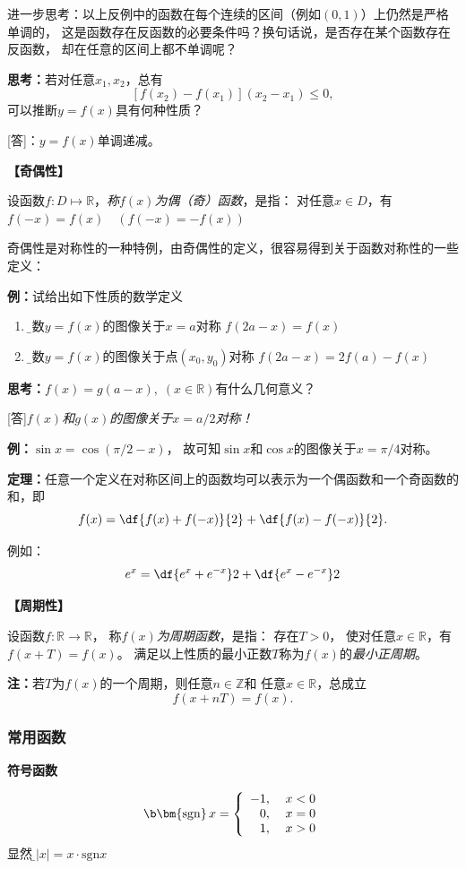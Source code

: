 进一步思考：以上反例中的函数在每个连续的区间（例如$(0,1)$）上仍然是严格单调的，
这是函数存在反函数的必要条件吗？换句话说，是否存在某个函数存在反函数，
却在任意的区间上都不单调呢？

{\b {\bf 思考：}若对任意$x_1,x_2$，总有
$$[f(x_2)-f(x_1)](x_2-x_1)\leq 0,$$
可以推断$y=f(x)$具有何种性质？}

[答]：$y=f(x)$单调递减。

{\bf 【奇偶性】}

	设函数$f:D\mapsto\mathbb{R}$，{\it 称$f(x)$为偶（奇）函数}，是指：
	对任意$x\in D$，有$f(-x)=f(x)\quad(f(-x)=-f(x))$

奇偶性是对称性的一种特例，由奇偶性的定义，很容易得到关于函数对称性的一些定义：

{\bf 例：}试给出如下性质的数学定义
\begin{enumerate}[(1)]
  \setlength{\itemindent}{1cm}
  \item {\b 函数$y=f(x)$的图像关于$x=a$对称
  \dotfill$f(2a-x)=f(x)$}
  \item {\b 函数$y=f(x)$的图像关于点$(x_0,y_0)$对称
  \dotfill $f(2a-x)=2f(a)-f(x)$}
\end{enumerate}

{\b {\bf 思考：}$f(x)=g(a-x),\;(x\in\mathbb{R})$有什么几何意义？

[答]{\it $f(x)$和$g(x)$的图像关于$x=a/2$对称！}}

{\bf 例：}$\sin x=\cos(\pi/2-x)$，
故可知$\sin x$和$\cos x$的图像关于$x=\pi/4$对称。

\begin{thx}
	{\bf 定理：}任意一个定义在对称区间上的函数均可以表示为一个偶函数和一个奇函数的和，即
	$$f(x)=\df{f(x)+f(-x)}{2}+\df{f(x)-f(-x)}{2}.$$
\end{thx}
例如：
$$e^x=\df{e^x+e^{-x}}2+\df{e^x-e^{-x}}2$$

{\bf 【周期性】}

设函数$f:\mathbb{R}\to\mathbb{R}$，
称{\it $f(x)$为周期函数}，是指： 存在$T>0$，
使对任意$x\in\mathbb{R}$，有
$f(x+T)=f(x)$。
满足以上性质的最小正数$T$称为$f(x)$的{\it 最小正周期}。
		 
{\bf 注：}若$T$为$f(x)$的一个周期，则任意$n\in\mathbb{Z}$和
任意$x\in\mathbb{R}$，总成立
$$f(x+nT)=f(x).$$

\subsubsection{常用函数}

{\bf 符号函数}

  $${\b \bm{\mathrm{sgn}}\,x =\left\{
	\begin{array}{rl}
	-1,\;&x<0 \\
	0,\;&x=0 \\
	1,\;&x>0
	\end{array}
  \right.}$$
显然，{\b $|x|=x \cdot\mathrm{sgn} x$}
	
